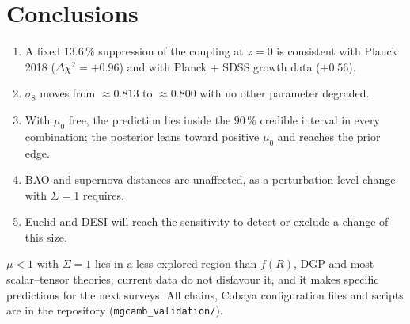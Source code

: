 \section{Conclusions}
\begin{enumerate}
\item A fixed $13.6\,\%$ suppression of the coupling at $z=0$ is consistent with Planck 2018 ($\Delta\chi^2=+0.96$) and with Planck + SDSS growth data ($+0.56$).
\item $\sigma_8$ moves from $\approx0.813$ to $\approx0.800$ with no other parameter degraded.
\item With $\mu_0$ free, the prediction lies inside the $90\,\%$ credible interval in every combination; the posterior leans toward positive $\mu_0$ and reaches the prior edge.
\item BAO and supernova distances are unaffected, as a perturbation-level change with $\Sigma=1$ requires.
\item Euclid and DESI will reach the sensitivity to detect or exclude a change of this size.
\end{enumerate}
$\mu<1$ with $\Sigma=1$ lies in a less explored region than $f(R)$, DGP and most scalar--tensor theories; current data do not disfavour it, and it makes specific
predictions for the next surveys. All chains, Cobaya configuration files and scripts are in the repository (\texttt{mgcamb\_validation/}).
